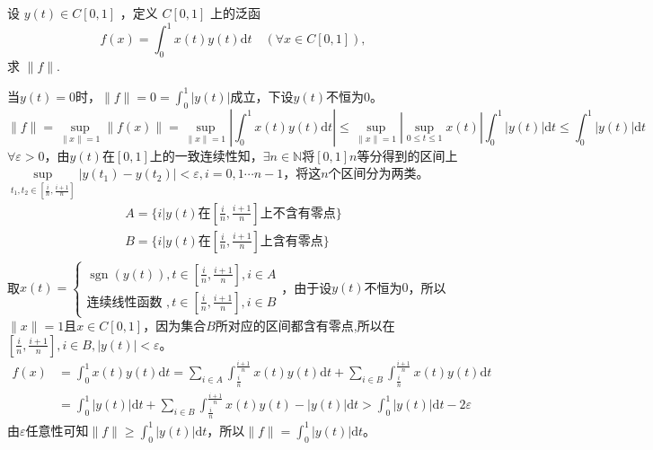 \documentclass[lang=cn,newtx,10pt,scheme=chinese,thmcnt=chapter]{elegantbook}
\newcommand{\dif}{\mathrm{d}}
\begin{document}
\begin{problem}
设 $y(t) \in C[0,1]$ ，定义 $C[0,1]$ 上的泛函
\begin{equation*}
f(x)=\int_0^1 x(t) y(t) \dif t \quad(\forall x \in C[0,1]),
\end{equation*}
求 $\|f\|$.
\end{problem}
\begin{solution}
当$y(t)=0$时，$\|f\|=0=\int_0^1|y(t)|$成立，下设$y(t)$不恒为$0$。\\
\[\|f\|=\sup\limits_{\|x\|=1}\|f(x)\|=\sup\limits_{\|x\|=1}\left|\int_0^1 x(t) y(t) \dif t\right|\leqslant\sup\limits_{\|x\|=1}\left|\sup\limits_{0\leqslant t\leqslant 1}x(t)\right|\int_0^1 | y(t)| \dif t\leqslant\int_0^1 | y(t)| \dif t\]
$\forall \varepsilon>0$，由$y(t)$在$[0,1]$上的一致连续性知，$\exists n\in \mathbb{N}$将$[0,1]$$n$等分得到的区间上$\sup\limits_{t_1,t_2\in[\frac{i}{n},\frac{i+1}{n}]}|y(t_1)-y(t_2)|<\varepsilon,i=0,1\cdots n-1$，将这$n$个区间分为两类。
\begin{equation*}
    \begin{aligned}
    A=\{i|y(t)\text{在}[\frac{i}{n},\frac{i+1}{n}]\text{上不含有零点}\}\\
        B=\{i|y(t)\text{在}[\frac{i}{n},\frac{i+1}{n}]\text{上含有零点}\}\\
    \end{aligned}
\end{equation*}
取$x(t)=\begin{cases}
    \operatorname{sgn}(y(t)),t\in [\frac{i}{n},\frac{i+1}{n}],i\in A\\
\text{连续线性函数 } ,t\in [\frac{i}{n},\frac{i+1}{n}],i\in B
\end{cases}$，由于设$y(t)$不恒为$0$，所以$\|x\|=1$且$x\in C[0,1]$，因为集合$B$所对应的区间都含有零点,所以在$[\frac{i}{n},\frac{i+1}{n}],i\in B,|y(t)|<\varepsilon$。
\begin{equation*}
    \begin{aligned}
    f(x)&=\int_0^1 x(t) y(t) \dif t=\sum\limits_{i\in A}\int_{\frac{i}{n}}^{\frac{i+1}{n}} x(t) y(t) \dif t+
    \sum\limits_{i\in B}\int_{\frac{i}{n}}^{\frac{i+1}{n}} x(t)y(t) \dif t\\
&=\int_{0}^{1} |y(t)| \dif t+
    \sum\limits_{i\in B}\int_{\frac{i}{n}}^{\frac{i+1}{n}} x(t)y(t)-|y(t)| \dif t>\int_{0}^{1} |y(t)| \dif t-2\varepsilon
    \end{aligned}
\end{equation*}
由$\varepsilon$任意性可知$\|f\|\geqslant \int_{0}^{1} |y(t)| \dif t$，所以$\|f\|=\int_{0}^{1} |y(t)| \dif t$。
\end{solution}
\end{document}
